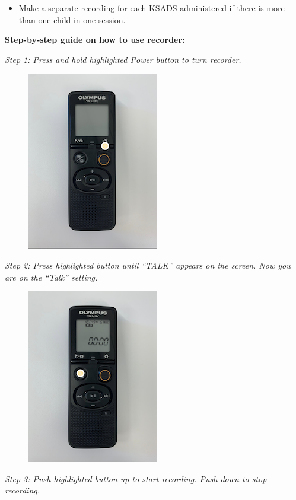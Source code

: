 \documentclass[]{book}
\providecommand{\tightlist}{%
  \setlength{\itemsep}{0pt}\setlength{\parskip}{0pt}}
\begin{document}
\begin{itemize}
\tightlist
\item
  Make a separate recording for each KSADS administered if there is more than one child in one session.
\end{itemize}

\textbf{Step-by-step guide on how to use recorder:}

\emph{Step 1: Press and hold highlighted Power button to turn recorder.}

\begin{figure}
\centering
\includegraphics{images/ksads/1.png}
\caption{}
\end{figure}

\emph{Step 2: Press highlighted button until ``TALK'' appears on the screen. Now you are on the ``Talk'' setting.}

\begin{figure}
\centering
\includegraphics{images/ksads/2.png}
\caption{}
\end{figure}

\emph{Step 3: Push highlighted button up to start recording. Push down to stop recording.}
\end{document}
